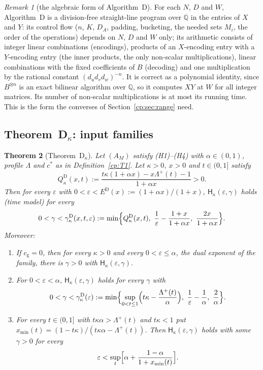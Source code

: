 \documentclass[11pt]{article}
\newtheorem{theorem}{Theorem}[section]
\theoremstyle{definition}
\theoremstyle{remark}
\newtheorem{remark}[theorem]{Remark}
\providecommand{\eps}{\varepsilon}
\providecommand{\Q}{\mathbb{Q}}
\newcommand{\Hypk}[1]{\mathsf{H}_{#1}}        %
\newcommand{\Lam}{\Lambda}                    %
\newcommand{\Lamp}{\Lambda^{+}}               %
\newcommand{\cg}{c_{\mathrm g}}               %
\newcommand{\cstar}{c^{*}}                    %
\newcommand{\Hcond}[1]{\textup{(H#1)}}        %
\newcommand{\ThmDk}{Theorem~D\texorpdfstring{\ensuremath{_\kappa}}{\_kappa}}     %
\newcommand{\AlgD}{Algorithm~D}                             %
\newcommand{\Qgain}[2]{Q^{#1}_{#2}}           %
\newcommand{\Erange}[1]{E^{#1}}               %
\newcommand{\gbound}[2]{\gamma^{#1}_{#2}}     %
\newcommand{\xmin}{x_{\min}}                  %
\begin{document}
\begin{remark}[the algebraic form of \AlgD]\label{cp:T6:alg}
For each $N$, $D$ and $W$, \AlgD{} is a division-free straight-line program over $\Q$ in the entries of $X$ and $Y$: its control flow ($n$, $K$, $D_A$, padding, bucketing, the needed sets $M_i$, the order of the operations) depends on $N$, $D$ and $W$ only; its arithmetic consists of integer linear combinations (encodings), products of an $X$-encoding entry with a $Y$-encoding entry (the inner products, the only non-scalar multiplications), linear combinations with the fixed coefficients of $B$ (decoding) and one multiplication by the rational constant $(d_ud_vd_w)^{-n}$. It is correct as a polynomial identity, since $B^{\otimes n}$ is an exact bilinear algorithm over $\Q$, so it computes $XY$ at $W$ for all integer matrices. Its number of non-scalar multiplications is at most its running time. This is the form the converses of Section~\ref{cp:sec:range} need.
\end{remark}

\subsection{\texorpdfstring{\ThmDk}{Theorem D\_kappa}: input families}\label{cp:sec:thmDk}

\begin{theorem}[\ThmDk]\label{cp:T7}
Let $(A_M)$ satisfy \Hcond1--\Hcond4 with $\alpha\in(0,1)$, profile $\Lam$ and $\cstar$ as in Definition~\ref{cp:T1}. Let $\kappa>0$, $x>0$ and $t\in(0,1]$ satisfy
\[
\Qgain{\mathrm D}\kappa(x,t):=\frac{t\kappa(1+\alpha x)-x\Lamp(t)-1}{1+\alpha x}>0.\tag{D1}
\]
Then for every $\eps$ with $0<\eps<\Erange{\mathrm D}(x):=(1+\alpha x)/(1+x)$, $\Hypk\kappa(\eps,\gamma)$ holds (time model) for every
\[
0<\gamma<\gbound{\mathrm D}\kappa(x,t,\eps):=\min\Bigl\{\Qgain{\mathrm D}\kappa(x,t),\ \frac1\eps-\frac{1+x}{1+\alpha x},\ \frac{2x}{1+\alpha x}\Bigr\}.
\]
Moreover:
\begin{enumerate}[label=(\alph*)]
\item If $\cg=0$, then for every $\kappa>0$ and every $0<\eps\le\alpha$, the dual exponent of the family, there is $\gamma>0$ with $\Hypk\kappa(\eps,\gamma)$.
\item For $0<\eps<\alpha$, $\Hypk\kappa(\eps,\gamma)$ holds for every $\gamma$ with
\[
0<\gamma<\gbound{\mathrm D}\kappa(\eps):=\min\Bigl\{\sup_{0<t\le1}\Bigl(t\kappa-\frac{\Lamp(t)}{\alpha}\Bigr),\ \frac1\eps-\frac1\alpha,\ \frac2\alpha\Bigr\}.
\]
\item For every $t\in(0,1]$ with $t\kappa\alpha>\Lamp(t)$ and $t\kappa<1$ put $\xmin(t)=(1-t\kappa)/(t\kappa\alpha-\Lamp(t))$. Then $\Hypk\kappa(\eps,\gamma)$ holds with some $\gamma>0$ for every
\[
\eps<\sup_t\Bigl[\alpha+\frac{1-\alpha}{1+\xmin(t)}\Bigr].
\]
\end{enumerate}
\end{theorem}
\end{document}
